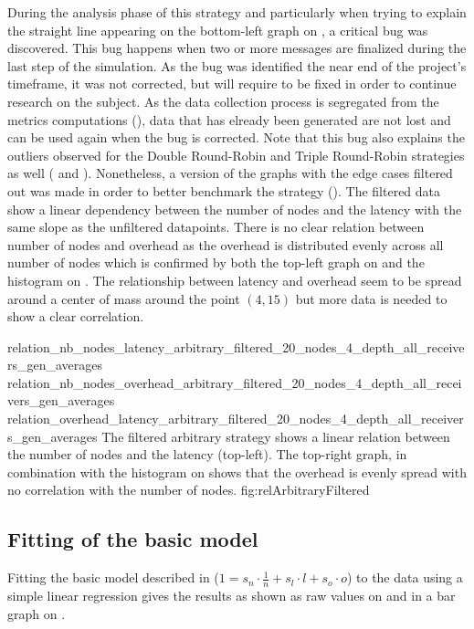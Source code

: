 During the analysis phase of this strategy and particularly when trying to
explain the straight line appearing on the bottom-left graph on
, a critical bug was discovered. This bug happens when two
or more messages are finalized during the last step of the simulation. As the
bug was identified the near end of the project's timeframe, it was not corrected,
but will require to be fixed in order to continue research on the subject. As
the data collection process is segregated from the metrics computations
(), data that has elready been generated are not
lost and can be used again when the bug is corrected. Note that this bug also
explains the outliers observed for the Double Round-Robin and Triple Round-Robin
strategies as well ( and ).
Nonetheless, a version of the graphs with the edge cases filtered out was made
in order to better benchmark the strategy ().
The filtered data show a linear dependency between the number of nodes and
the latency with the same slope as the unfiltered datapoints. There is no clear
relation between number of nodes and overhead as the overhead is distributed
evenly across all number of nodes which is confirmed by both the top-left graph
on  and the histogram on .
The relationship between latency and overhead seem to be spread around a center
of mass around the point \((4, 15)\) but more data is needed to show a clear
correlation.


\triplefigure
    {relation_nb_nodes_latency_arbitrary_filtered_20_nodes_4_depth_all_receivers_gen_averages}
    {relation_nb_nodes_overhead_arbitrary_filtered_20_nodes_4_depth_all_receivers_gen_averages}
    {relation_overhead_latency_arbitrary_filtered_20_nodes_4_depth_all_receivers_gen_averages}
    {The filtered arbitrary strategy shows a linear relation between the number of
    nodes and the latency (top-left). The top-right graph, in combination with
    the histogram on  shows that the overhead is evenly
    spread with no correlation with the number of nodes.}
    {fig:relArbitraryFiltered}


\FloatBarrier
\subsection{Fitting of the basic model}
\label{ssec:fittingBase}
Fitting the basic model described in  (\(1 = s_n \cdot
\frac{1}{n} + s_l\cdot l + s_o\cdot o\)) to the data using a simple linear
regression gives the results as shown as raw values on  and
in a bar graph on .

